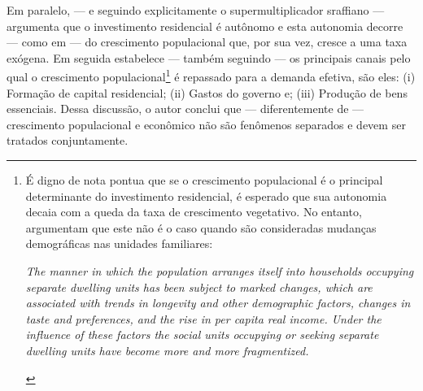 Em paralelo, --- e seguindo explicitamente o supermultiplicador sraffiano --- \textcite{gowans_introducing_2014} argumenta que o investimento residencial é autônomo e esta autonomia decorre --- como em \textcite{hansen_economic_1939} --- do crescimento populacional que, por sua vez, cresce a uma taxa exógena.
Em seguida estabelece --- também seguindo \textcite{hansen_economic_1939} --- os principais canais pelo qual o crescimento populacional\footnote{
É digno de nota pontua que se o crescimento populacional é o principal determinante do investimento residencial, é esperado que sua autonomia decaia com a queda da taxa de crescimento vegetativo.
No entanto,  \textcite[p.~11]{grebler_capital_1956} argumentam que este não é o caso quando são consideradas mudanças demográficas nas unidades familiares:

\begin{citacao}
	\textit{The manner in which the population arranges itself into households
		occupying separate dwelling units has been subject to marked changes,
		which are associated with trends in longevity and other demographic
		factors, changes in taste and preferences, and the rise in per capita real
		income. Under the influence of these factors the social units occupying
		or seeking separate dwelling units have become more and more fragmentized.}
\end{citacao}
} é repassado para a demanda efetiva, são eles: (i) Formação de capital residencial; (ii) Gastos do governo e; (iii) Produção de bens essenciais.
Dessa discussão, o autor conclui que --- diferentemente de \textcite{robinson_model_1962} --- crescimento populacional e econômico não são fenômenos separados e devem ser tratados conjuntamente.

